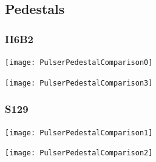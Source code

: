 \documentclass[9pt]{beamer}
\begin{document}
\subsection{Pedestals}
\begin{frame}
	\frametitle{II6B2}
	\begin{center}
		\begin{minipage}{5.5cm}
			\centering
			\texttt{[image: PulserPedestalComparison0]}\\
		\end{minipage}
		\begin{minipage}{5.5cm}
			\centering
			\texttt{[image: PulserPedestalComparison3]}\\
		\end{minipage}
	\end{center}
\end{frame}
\begin{frame}
	\frametitle{S129}
	\begin{center}
		\begin{minipage}{5.5cm}
			\centering
			\texttt{[image: PulserPedestalComparison1]}\\
		\end{minipage}
		\begin{minipage}{5.5cm}
			\centering
			\texttt{[image: PulserPedestalComparison2]}\\
		\end{minipage}
	\end{center}
\end{frame}
\end{document}
